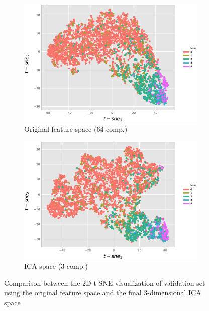 \begin{figure}[h]
	\centering
	\begin{subfigure}[b]{0.49\textwidth}
		\centering
		\includegraphics[width=\textwidth]{Figures/chapter_ica/figures/tsne2d_p75.eps}
		\caption{Original feature space (64 comp.)}	
	\end{subfigure}
	\begin{subfigure}[b]{0.49\textwidth}
		\centering
		\includegraphics[width=\textwidth]{Figures/chapter_ica/figures/tsne2d_ica_p75.eps}
		\caption{ICA space (3 comp.)}
	\end{subfigure}
	
	\caption[Original and ICA feature space visualization]{Comparison between the 2D t-SNE visualization of validation set using the original feature space and the final 3-dimensional ICA space}  
	\label{fig:tsne} 
\end{figure}

